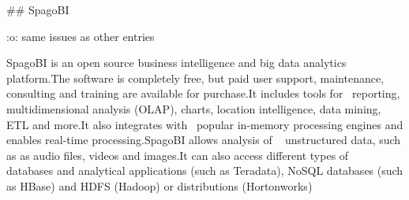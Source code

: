 ## SpagoBI

:o: same issues as other entries

SpagoBI is an open source business intelligence and big data analytics platform.The software is completely free, but paid user support, maintenance, consulting and training are available for purchase.It includes tools for~\cite{spagobi} reporting, multidimensional analysis (OLAP), charts, location intelligence, data mining, ETL and more.It also integrates with~\cite{spagobi} popular in-memory processing engines and enables real-time processing.SpagoBI allows analysis of ~\cite{stratebi-bigdata} unstructured data, such as as audio files, videos and images.It can also access different types of
~\cite{stratebi-bigdata} databases and analytical applications (such as Teradata), NoSQL databases (such as HBase) and HDFS (Hadoop) or distributions (Hortonworks)
